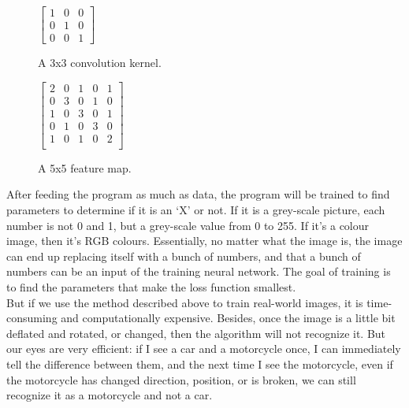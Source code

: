 \begin{figure}[!tbp]
  \centering
  \begin{minipage}[b]{0.4\textwidth}
    \centering
    $\begin{bmatrix}
    1 & 0 & 0\\
    0 & 1 & 0\\
    0 & 0 & 1
    \end{bmatrix}$
    \caption{A 3x3 convolution kernel.}
    \label{fig:3x3_convolution_kernel}
  \end{minipage}
  \hfill
  \begin{minipage}[b]{0.4\textwidth}
    \centering
    $\begin{bmatrix}
    2 & 0 & 1 & 0 & 1\\
    0 & 3 & 0 & 1 & 0\\
    1 & 0 & 3 & 0 & 1\\
    0 & 1 & 0 & 3 & 0\\
    1 & 0 & 1 & 0 & 2\\
    \end{bmatrix}$
    \caption{A 5x5 feature map.}
    \label{fig:5x5_feature_map}
  \end{minipage}
\end{figure}



After feeding the program as much as data, the program will be trained to find parameters to determine if it is an `X' or not. If it is a grey-scale picture, each number is not 0 and 1, but a grey-scale value from 0 to 255. If it's a colour image, then it's RGB colours. Essentially, no matter what the image is, the image can end up replacing itself with a bunch of numbers, and that a bunch of numbers can be an input of the training neural network. The goal of training is to find the parameters that make the loss function smallest.\\

But if we use the method described above to train real-world images, it is time-consuming and computationally expensive. Besides, once the image is a little bit deflated and rotated, or changed, then the algorithm will not recognize it. But our eyes are very efficient: if I see a car and a motorcycle once, I can immediately tell the difference between them, and the next time I see the motorcycle, even if the motorcycle has changed direction, position, or is broken, we can still recognize it as a motorcycle and not a car.\\


